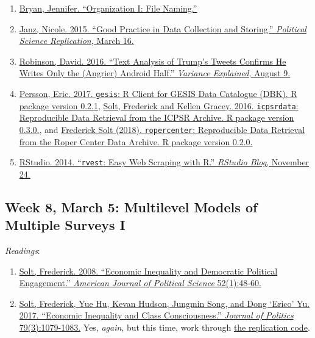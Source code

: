 \documentclass[]{article}
\providecommand{\tightlist}{%
  \setlength{\itemsep}{0pt}\setlength{\parskip}{0pt}}
\begin{document}
\begin{enumerate}
\def\labelenumi{\arabic{enumi}.}
\tightlist
\item
  \href{https://rawgit.com/Reproducible-Science-Curriculum/rr-organization1/master/organization-01-slides.html}{Bryan,
  Jennifer. ``Organization I: File Naming.''}
\item
  \href{https://politicalsciencereplication.wordpress.com/2015/03/16/good-practice-in-data-collection-and-storing/}{Janz,
  Nicole. 2015. ``Good Practice in Data Collection and Storing.''
  \emph{Political Science Replication}, March 16.}
\item
  \href{http://varianceexplained.org/r/trump-tweets/}{Robinson, David.
  2016. ``Text Analysis of Trump's Tweets Confirms He Writes Only the
  (Angrier) Android Half.'' \emph{Variance Explained}, August 9.}
\item
  \href{https://cran.r-project.org/web/packages/gesis/vignettes/gesis.html}{Persson,
  Eric. 2017. \texttt{gesis}: R Client for GESIS Data Catalogue (DBK). R
  package version 0.2.1},
  \href{https://cran.r-project.org/web/packages/icpsrdata/vignettes/icpsrdata-vignette.html}{Solt,
  Frederick and Kellen Gracey. 2016. \texttt{icpsrdata}: Reproducible
  Data Retrieval from the ICPSR Archive. R package version 0.3.0.}, and
  \href{https://cran.r-project.org/web/packages/ropercenter/vignettes/ropercenter-vignette.html}{Frederick
  Solt (2018). \texttt{ropercenter}: Reproducible Data Retrieval from
  the Roper Center Data Archive. R package version 0.2.0.}
\item
  \href{https://blog.rstudio.org/2014/11/24/rvest-easy-web-scraping-with-r/}{RStudio.
  2014. ``\texttt{rvest}: Easy Web Scraping with R.'' \emph{RStudio
  Blog}, November 24.}
\end{enumerate}

\hypertarget{week-8-march-5-multilevel-models-of-multiple-surveys-i}{%
\subsection{Week 8, March 5: Multilevel Models of Multiple Surveys
I}\label{week-8-march-5-multilevel-models-of-multiple-surveys-i}}

\emph{Readings}:

\begin{enumerate}
\def\labelenumi{\arabic{enumi}.}
\tightlist
\item
  \href{http://www.jstor.org.proxy.lib.uiowa.edu/stable/25193796}{Solt,
  Frederick. 2008. ``Economic Inequality and Democratic Political
  Engagement.'' \emph{American Journal of Political Science}
  52(1):48-60.}
\item
  \href{https://www-journals-uchicago-edu.proxy.lib.uiowa.edu/doi/pdfplus/10.1086/690971}{Solt,
  Frederick, Yue Hu, Kevan Hudson, Jungmin Song, and Dong `Erico' Yu.
  2017. ``Economic Inequality and Class Consciousness.'' \emph{Journal
  of Politics} 79(3):1079-1083.} Yes, \emph{again}, but this time, work
  through
  \href{https://github.com/fsolt/class_consciousness/blob/master/paper/class_consciousness.Rnw}{the
  replication code}.
\end{enumerate}
\end{document}
